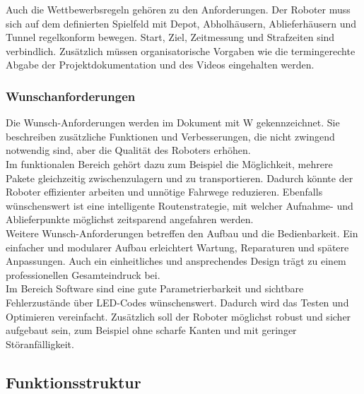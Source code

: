 \documentclass[11pt,a4paper]{article}
\begin{document}
	\noindent
	Auch die Wettbewerbsregeln gehören zu den Anforderungen. Der Roboter muss sich auf dem definierten Spielfeld mit Depot, Abholhäusern, Ablieferhäusern und Tunnel regelkonform bewegen. Start, Ziel, Zeitmessung und Strafzeiten sind verbindlich. Zusätzlich müssen organisatorische Vorgaben wie die termingerechte Abgabe der Projektdokumentation und des Videos eingehalten werden.
	
	\subsubsection{Wunschanforderungen}
	
	Die Wunsch-Anforderungen werden im Dokument mit W gekennzeichnet. Sie beschreiben zusätzliche Funktionen und Verbesserungen, die nicht zwingend notwendig sind, aber die Qualität des Roboters erhöhen.
	\\
	
	\noindent
	Im funktionalen Bereich gehört dazu zum Beispiel die Möglichkeit, mehrere Pakete gleichzeitig zwischenzulagern und zu transportieren. Dadurch könnte der Roboter effizienter arbeiten und unnötige Fahrwege reduzieren. Ebenfalls wünschenswert ist eine intelligente Routenstrategie, mit welcher Aufnahme- und Ablieferpunkte möglichst zeitsparend angefahren werden.
	\\
	
	\noindent
	Weitere Wunsch-Anforderungen betreffen den Aufbau und die Bedienbarkeit. Ein einfacher und modularer Aufbau erleichtert Wartung, Reparaturen und spätere Anpassungen. Auch ein einheitliches und ansprechendes Design trägt zu einem professionellen Gesamteindruck bei.
	\\
	
	\noindent
	Im Bereich Software sind eine gute Parametrierbarkeit und sichtbare Fehlerzustände über LED-Codes wünschenswert. Dadurch wird das Testen und Optimieren vereinfacht. Zusätzlich soll der Roboter möglichst robust und sicher aufgebaut sein, zum Beispiel ohne scharfe Kanten und mit geringer Störanfälligkeit.
	
	\newpage
	\subsection{Funktionsstruktur}
	
\end{document}
